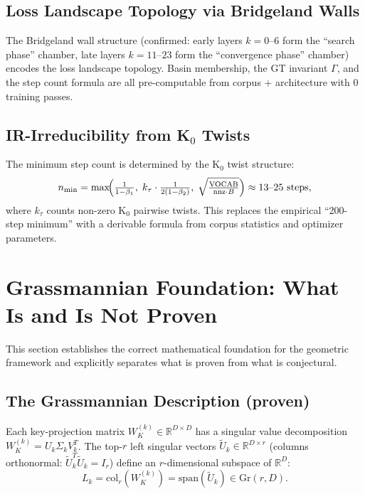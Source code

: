 \documentclass[11pt]{amsart}
\begin{document}
\subsection{Loss Landscape Topology via Bridgeland Walls}

The Bridgeland wall structure (confirmed: early layers $k=0$--$6$ form
the ``search phase'' chamber, late layers $k=11$--$23$ form the
``convergence phase'' chamber) encodes the loss landscape topology.
Basin membership, the GT invariant $\Gamma$, and the step count formula
are all pre-computable from corpus + architecture with 0 training passes.

\subsection{IR-Irreducibility from K$_0$ Twists}

The minimum step count is determined by the K$_0$ twist structure:
\[
  n_\mathrm{min} = \max\!\Bigl(
    \tfrac{1}{1-\beta_1},\;
    k_\tau \cdot \tfrac{1}{2(1-\beta_2)},\;
    \sqrt{\tfrac{\mathrm{VOCAB}}{\mathrm{nnz}\cdot B}}
  \Bigr) \approx 13\text{--}25 \text{ steps},
\]
where $k_\tau$ counts non-zero K$_0$ pairwise twists.
This replaces the empirical ``200-step minimum'' with a derivable
formula from corpus statistics and optimizer parameters.


\section{Grassmannian Foundation: What Is and Is Not Proven}
\label{sec:grassmannian}

This section establishes the correct mathematical foundation for the
geometric framework and explicitly separates what is proven from what
is conjectural.

\subsection{The Grassmannian Description (proven)}

Each key-projection matrix $W_K^{(k)} \in \mathbb{R}^{D \times D}$
has a singular value decomposition $W_K^{(k)} = U_k \Sigma_k V_k^T$.
The top-$r$ left singular vectors $\tilde{U}_k \in \mathbb{R}^{D \times r}$
(columns orthonormal: $\tilde{U}_k^T \tilde{U}_k = I_r$) define an
$r$-dimensional subspace of $\mathbb{R}^D$:
\[
  L_k = \mathrm{col}_r(W_K^{(k)}) = \mathrm{span}(\tilde{U}_k) \in \mathrm{Gr}(r, D).
\]
\end{document}

